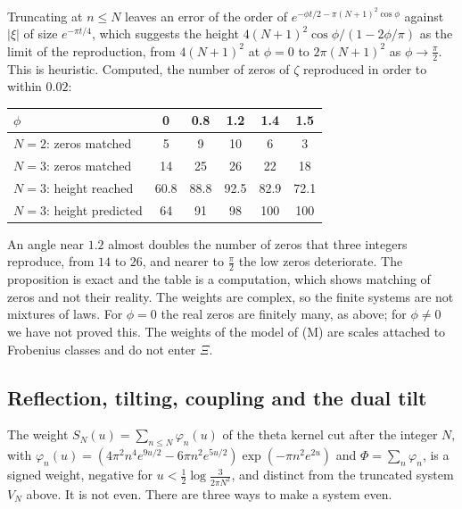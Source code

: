 Truncating at $n\le N$ leaves an error of the order of $e^{-\phi t/2-\pi(N+1)^2\cos\phi}$ against $|\xi|$ of size $e^{-\pi t/4}$, which suggests the height $4(N+1)^2\cos\phi/(1-2\phi/\pi)$ as the limit of the reproduction, from $4(N+1)^2$ at $\phi=0$ to $2\pi(N+1)^2$ as $\phi\to\frac\pi2$. This is heuristic. Computed, the number of zeros of $\zeta$ reproduced in order to within $0.02$:
\begin{center}
\small
\begin{tabular}{lccccc}
\hline
$\phi$ & 0 & 0.8 & 1.2 & 1.4 & 1.5\\
\hline
$N=2$: zeros matched & 5 & 9 & 10 & 6 & 3\\
$N=3$: zeros matched & 14 & 25 & 26 & 22 & 18\\
$N=3$: height reached & 60.8 & 88.8 & 92.5 & 82.9 & 72.1\\
$N=3$: height predicted & 64 & 91 & 98 & 100 & 100\\
\hline
\end{tabular}
\end{center}
An angle near $1.2$ almost doubles the number of zeros that three integers reproduce, from $14$ to $26$, and nearer to $\frac\pi2$ the low zeros deteriorate. The proposition is exact and the table is a computation, which shows matching of zeros and not their reality. The weights are complex, so the finite systems are not mixtures of laws. For $\phi=0$ the real zeros are finitely many, as above; for $\phi\ne0$ we have not proved this. The weights of the model of (M) are scales attached to Frobenius classes and do not enter $\Xi$.

\subsection{Reflection, tilting, coupling and the dual tilt}\label{lxi:sub:map}

The weight $S_N(u)=\sum_{n\le N}\varphi_n(u)$ of the theta kernel cut after the integer $N$, with $\varphi_n(u)=(4\pi^2n^4e^{9u/2}-6\pi n^2e^{5u/2})\exp(-\pi n^2e^{2u})$ and $\Phi=\sum_n\varphi_n$, is a signed weight, negative for $u<\frac12\log\frac3{2\pi N^2}$, and distinct from the truncated system $V_N$ above. It is not even. There are three ways to make a system even.

